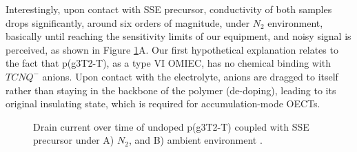 Interestingly, upon contact with SSE precursor, conductivity of both samples drops significantly, around six orders of magnitude, under $N_{2}$ environment, basically until reaching the sensitivity limits of our equipment, and noisy signal is perceived, as shown in Figure \ref{fig:revox1}A. Our first hypothetical explanation relates to the fact that p(g3T2-T), as a type VI OMIEC, has no chemical binding with $TCNQ^{-}$ anions. Upon contact with the electrolyte, anions are dragged to itself rather than staying in the backbone of the polymer (de-doping), leading to its original insulating state, which is required for accumulation-mode OECTs.

\begin{figure}[ht]
    \centering
    \caption[Drain current over time of undoped-p(g3T2-T) coupled with SSE precursor]{Drain current over time of undoped p(g3T2-T) coupled with SSE precursor under A) $N_{2}$, and B) ambient environment%
    .}
    \label{fig:revox1}
\end{figure}

